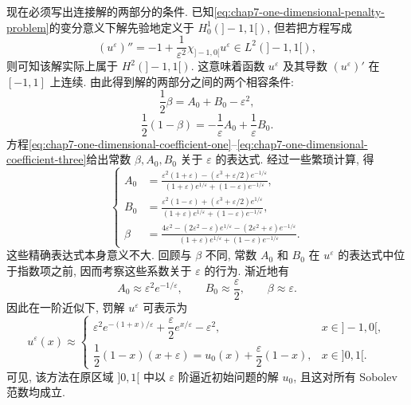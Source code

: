 \begin{sloppypar}
现在必须写出连接解的两部分的条件. 已知\eqref{eq:chap7-one-dimensional-penalty-problem}的变分意义下解先验地定义于 $H_0^1(]-1,1[)$, 但若把方程写成
\[
 (u^\varepsilon)''=-1+\frac1{\varepsilon^2}\chi_{]-1,0[}u^\varepsilon
 \in L^2(]-1,1[),
\]
则可知该解实际上属于 $H^2(]-1,1[)$. 这意味着函数 $u^\varepsilon$ 及其导数 $(u^\varepsilon)'$ 在 $[-1,1]$ 上连续. 由此得到解的两部分之间的两个相容条件:
\begin{equation}
 \frac12\beta=A_0+B_0-\varepsilon^2,
\label{eq:chap7-one-dimensional-coefficient-two}
\end{equation}
\begin{equation}
 \frac12(1-\beta)=-\frac1\varepsilon A_0+\frac1\varepsilon B_0.
\label{eq:chap7-one-dimensional-coefficient-three}
\end{equation}
方程\eqref{eq:chap7-one-dimensional-coefficient-one}--\eqref{eq:chap7-one-dimensional-coefficient-three}给出常数 $\beta,A_0,B_0$ 关于 $\varepsilon$ 的表达式. 经过一些繁琐计算, 得
\[
\left\{
\begin{aligned}
 A_0&=\frac{\varepsilon^2(1+\varepsilon)-(\varepsilon^3+\varepsilon/2)e^{-1/\varepsilon}}
 {(1+\varepsilon)e^{1/\varepsilon}+(1-\varepsilon)e^{-1/\varepsilon}},\\
 B_0&=\frac{\varepsilon^2(1-\varepsilon)+(\varepsilon^3+\varepsilon/2)e^{1/\varepsilon}}
 {(1+\varepsilon)e^{1/\varepsilon}+(1-\varepsilon)e^{-1/\varepsilon}},\\
 \beta&=\frac{4\varepsilon^2-(2\varepsilon^2-\varepsilon)e^{1/\varepsilon}
 -(2\varepsilon^2+\varepsilon)e^{-1/\varepsilon}}
 {(1+\varepsilon)e^{1/\varepsilon}+(1-\varepsilon)e^{-1/\varepsilon}}.
\end{aligned}
\right.
\]
这些精确表达式本身意义不大. 回顾与 $\beta$ 不同, 常数 $A_0$ 和 $B_0$ 在 $u^\varepsilon$ 的表达式中位于指数项之前, 因而考察这些系数关于 $\varepsilon$ 的行为. 渐近地有
\[
 A_0\approx\varepsilon^2e^{-1/\varepsilon},\qquad
 B_0\approx\frac\varepsilon2,\qquad
 \beta\approx\varepsilon.
\]
因此在一阶近似下, 罚解 $u^\varepsilon$ 可表示为
\[
 u^\varepsilon(x)\approx
 \begin{cases}
  \varepsilon^2e^{-(1+x)/\varepsilon}+\dfrac\varepsilon2e^{x/\varepsilon}-\varepsilon^2,
  &x\in]-1,0[,\\[4pt]
  \dfrac12(1-x)(x+\varepsilon)=u_0(x)+\dfrac\varepsilon2(1-x),
  &x\in]0,1[.
 \end{cases}
\]
可见, 该方法在原区域 $]0,1[$ 中以 $\varepsilon$ 阶逼近初始问题的解 $u_0$, 且这对所有 Sobolev 范数均成立.


\end{sloppypar}
